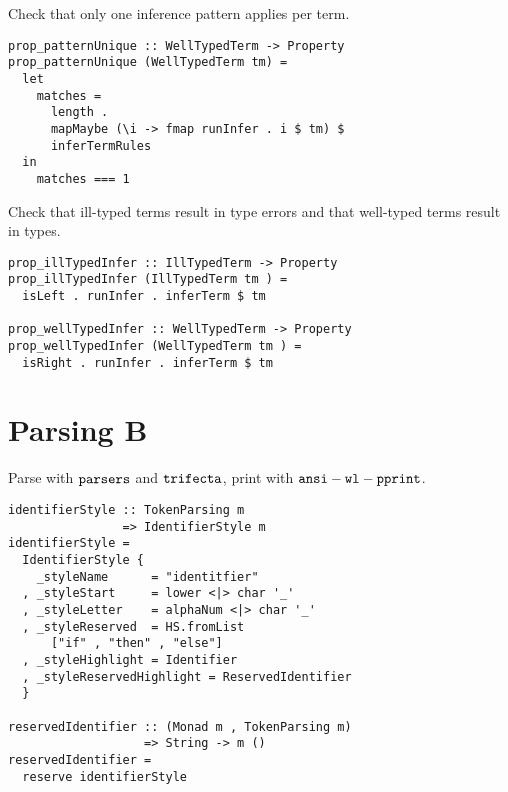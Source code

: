 \documentclass{beamer}
\begin{document}
\begin{frame}[fragile]
  \begin{center}
   Check that only one inference pattern applies per term.
  \end{center}
  \begin{verbatim}
prop_patternUnique :: WellTypedTerm -> Property
prop_patternUnique (WellTypedTerm tm) =
  let
    matches =
      length .
      mapMaybe (\i -> fmap runInfer . i $ tm) $
      inferTermRules
  in
    matches === 1
  \end{verbatim}
\end{frame} 

\begin{frame}[fragile]
  \begin{center}
   Check that ill-typed terms result in type errors and that well-typed terms
   result in types.
  \end{center}
  \begin{verbatim}
prop_illTypedInfer :: IllTypedTerm -> Property
prop_illTypedInfer (IllTypedTerm tm ) =
  isLeft . runInfer . inferTerm $ tm

prop_wellTypedInfer :: WellTypedTerm -> Property
prop_wellTypedInfer (WellTypedTerm tm ) =
  isRight . runInfer . inferTerm $ tm
  \end{verbatim}
\end{frame} 

\section{Parsing B}

\begin{frame}[c]
  \begin{center}
Parse with $\tt{parsers}$ and $\tt{trifecta}$, print with $\tt{ansi-wl-pprint}$.
  \end{center}
\end{frame}

\begin{frame}[fragile]
  \begin{verbatim}
identifierStyle :: TokenParsing m
                => IdentifierStyle m
identifierStyle =
  IdentifierStyle {
    _styleName      = "identitfier"
  , _styleStart     = lower <|> char '_'
  , _styleLetter    = alphaNum <|> char '_'
  , _styleReserved  = HS.fromList 
      ["if" , "then" , "else"]
  , _styleHighlight = Identifier
  , _styleReservedHighlight = ReservedIdentifier
  }

reservedIdentifier :: (Monad m , TokenParsing m)
                   => String -> m ()
reservedIdentifier =
  reserve identifierStyle
  \end{verbatim}
\end{frame} 
\end{document}
